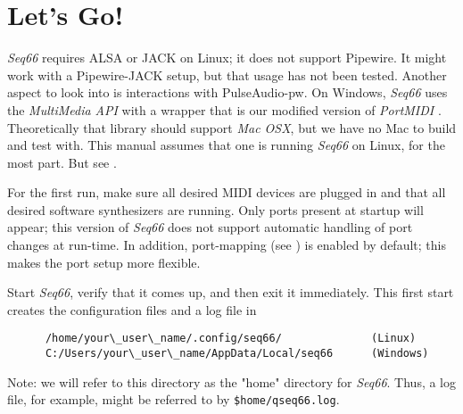 %
%
%

\section{Let's Go!}
\label{sec:introduction_lets_go}

   \textsl{Seq66} requires ALSA or JACK on Linux;
   it does not support
   Pipewire.
   It might work with a Pipewire-JACK setup, but that usage has not been
   tested.
   Another aspect to look into is interactions with
   PulseAudio-pw.
   On Windows, \textsl{Seq66} uses the \textsl{MultiMedia API} with a wrapper
   that is our modified version of \textsl{PortMIDI} \cite{portmidi}.
   Theoretically that library should support
   \textsl{Mac OSX}, but we have no Mac to build and test with.
   This manual assumes that one is running \textsl{Seq66} on Linux, for the
   most part.
   But see .

   For the first run, make sure all desired MIDI devices are plugged in and
   that all desired software synthesizers are running.
   Only ports present at startup will appear; this version of
   \textsl{Seq66} does not
   support automatic handling of port changes at run-time.
   In addition, port-mapping (see ) is
   enabled by default; this makes the port setup more flexible.

   Start \textsl{Seq66}, verify that it comes up, and then exit it
   immediately.
   This first start creates the configuration files and a log file in

   \begin{verbatim}
      /home/your\_user\_name/.config/seq66/              (Linux)
      C:/Users/your\_user\_name/AppData/Local/seq66      (Windows)
   \end{verbatim}

   Note: we will refer to this directory as the "home" directory
   for \textsl{Seq66}.
   Thus, a log file, for example, might be referred to by
   \texttt{\$home/qseq66.log}.

